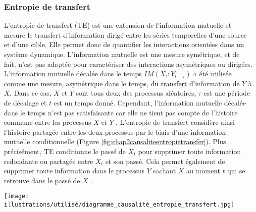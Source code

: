 \subsubsection{Entropie de transfert}
\label{transfen}

L'entropie de transfert (TE) est une extension de l'information mutuelle et mesure le transfert d'information dirigé entre les séries temporelles d'une source et d'une cible. 
Elle permet donc de quantifier les interactions orientées dans un système dynamique. 
L'information mutuelle est une mesure symétrique, et de fait, n'est pas adaptée pour caractériser des interactions asymétriques ou dirigées. 
L'information mutuelle décalée dans le temps $IM(X_t:Y_{t-\tau})$ a été utilisée comme une mesure, asymétrique dans le temps, du transfert d'information de $Y$ à $X$. 
Dans ce cas, $X$ et $Y$ sont tous deux des processus aléatoires, $\tau$ est une période de décalage et $t$ est un temps donné. 
Cependant, l'information mutuelle décalée dans le temps n'est pas satisfaisante car elle ne tient pas compte de l'histoire commune entre les processus $X$ et $Y$ \citep{kaiser2002information, ikegwu2020pyif}. 
L'entropie de transfert considère ainsi l'histoire partagée entre les deux processus par le biais d'une information mutuelle conditionnelle (Figure \ref{fig:chap2causaliteentropietransfer}). 
Plus précisément, TE conditionne le passé de $X_t$ pour supprimer toute information redondante ou partagée entre $X_t$ et son passé. 
Cela permet également de supprimer toute information dans le processus $Y$ sachant $X$ au moment $t$ qui se retrouve dans le passé de $X$ \citep{williams2011generalized, ikegwu2020pyif}. 

\begin{figure*}[!t]
\center
\texttt{[image: illustrations/utilisé/diagramme\_causalité\_entropie\_transfert.jpg]}
\caption[Diagramme de causalité temporelle et entropie de transfert]{Diagramme de causalité temporelle et entropie de transfert. (Gauche) Définition de la causalité temporelle par des dépendances statistiques en supposant des décalages temporels entre deux signaux. Dans cette définition, il y a un fenêtrage temporel $t - \Delta \tau$ dans les deux signaux qui causent les variations de $y(\Delta t)$. (Droite) Diagramme de Venn montrant la relation entre chaque variable et leur intersection. Dans le cas d'une éventuelle causalité temporelle, la mesure de l'entropie de transfert est l'une des plus utilisées dans la littérature. Adapté de \cite{faber2020critical}.}
\label{fig:chap2causaliteentropietransfer}
\end{figure*}


